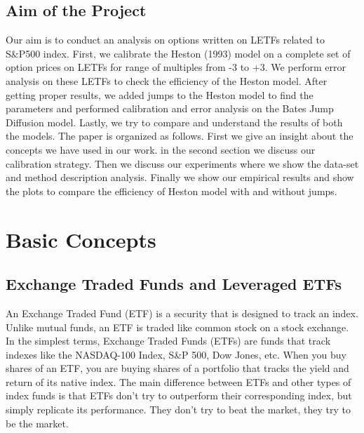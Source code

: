 \documentclass{article}
\begin{document}
\subsection{Aim of the Project}
Our aim is to conduct an analysis on options written on LETFs related to S&P500 index. First, we calibrate the Heston (1993) model on a complete set of option prices on LETFs for range of multiples from -3 to +3. We perform error analysis on these LETFs to check the efficiency of the Heston model. After getting proper results, we added jumps to the Heston model to find the parameters and performed calibration and error analysis on the Bates Jump Diffusion model. Lastly, we try to compare and understand the results of both the models.
\newline\newline
The paper is organized as follows. First we give an insight about the concepts we have used in our work. in the second section we discuss our calibration strategy. Then we discuss our experiments where we show the data-set and method description analysis. Finally we show our empirical results and show the plots to compare the efficiency of Heston model with and without jumps.

\section{Basic Concepts}
\subsection{Exchange Traded Funds and Leveraged ETFs}
An Exchange Traded Fund (ETF) is a security that is designed to track an index. Unlike mutual funds, an ETF is traded like common stock on a stock exchange.\citep{ref2} In the simplest terms, Exchange Traded Funds (ETFs) are funds that track indexes like the NASDAQ-100 Index, S&P 500, Dow Jones, etc. When you buy shares of an ETF, you are buying shares of a portfolio that tracks the yield and return of its native index. The main difference between ETFs and other types of index funds is that ETFs don't try to outperform their corresponding index, but simply replicate its performance. They don't try to beat the market, they try to be the market.\citep{ref4}
\newlin\newline
\end{document}
